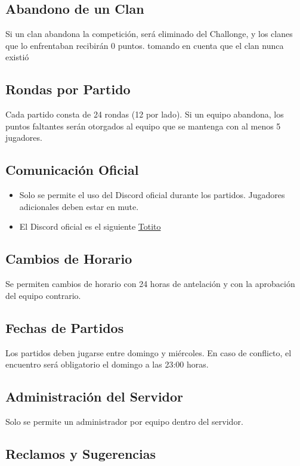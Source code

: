 \documentclass[a4paper, 11pt]{article}
\begin{document}
    \subsection{Abandono de un Clan}
    Si un clan abandona la competición, será eliminado del Challonge, y los clanes que lo enfrentaban recibirán 0 puntos. tomando en cuenta que el clan nunca existió

    \subsection{Rondas por Partido}
    Cada partido consta de 24 rondas (12 por lado). Si un equipo abandona, los puntos faltantes serán otorgados al equipo que se mantenga con al menos 5 jugadores.

    \subsection{Comunicación Oficial}
    \begin{itemize}
        \item Solo se permite el uso del Discord oficial durante los partidos. Jugadores adicionales deben estar en mute.
        \item El Discord oficial es el siguiente \hyperlink{https://discord.gg/ajQxVbh8}{Totito}
    \end{itemize}

    \subsection{Cambios de Horario}
    Se permiten cambios de horario con 24 horas de antelación y con la aprobación del equipo contrario.

    \subsection{Fechas de Partidos}
    Los partidos deben jugarse entre domingo y miércoles. En caso de conflicto, el encuentro será obligatorio el domingo a las 23:00 horas.

    \subsection{Administración del Servidor}
    Solo se permite un administrador por equipo dentro del servidor.

    \subsection{Reclamos y Sugerencias}
\end{document}
